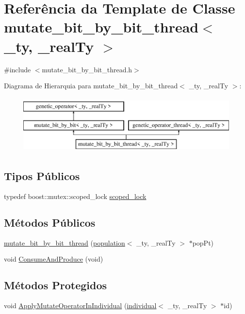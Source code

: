 \hypertarget{classmutate__bit__by__bit__thread}{
\section{Referência da Template de Classe mutate\_\-bit\_\-by\_\-bit\_\-thread$<$ \_\-ty, \_\-realTy $>$}
\label{classmutate__bit__by__bit__thread}
}


{\ttfamily \#include $<$mutate\_\-bit\_\-by\_\-bit\_\-thread.h$>$}

Diagrama de Hierarquia para mutate\_\-bit\_\-by\_\-bit\_\-thread$<$ \_\-ty, \_\-realTy $>$:\begin{figure}[H]
\begin{center}
\leavevmode
\includegraphics[height=3cm]{classmutate__bit__by__bit__thread}
\end{center}
\end{figure}
\subsection*{Tipos Públicos}
\begin{DoxyCompactItemize}
\item 
typedef boost::mutex::scoped\_\-lock \hyperlink{classmutate__bit__by__bit__thread_a059838b054d4de64b20d33d1db7e89c0}{scoped\_\-lock}
\end{DoxyCompactItemize}
\subsection*{Métodos Públicos}
\begin{DoxyCompactItemize}
\item 
\hyperlink{classmutate__bit__by__bit__thread_a3f2bb991bf06934cb614d2fb91f2bf0a}{mutate\_\-bit\_\-by\_\-bit\_\-thread} (\hyperlink{classpopulation}{population}$<$ \_\-ty, \_\-realTy $>$ $\ast$popPt)
\item 
void \hyperlink{classmutate__bit__by__bit__thread_a13d804deae7d91aa75897068eb733050}{ConsumeAndProduce} (void)
\end{DoxyCompactItemize}
\subsection*{Métodos Protegidos}
\begin{DoxyCompactItemize}
\item 
void \hyperlink{classmutate__bit__by__bit__thread_a452b4832fd083ab19d3f3f65b79bf271}{ApplyMutateOperatorInIndividual} (\hyperlink{classindividual}{individual}$<$ \_\-ty, \_\-realTy $>$ $\ast$id)
\end{DoxyCompactItemize}

